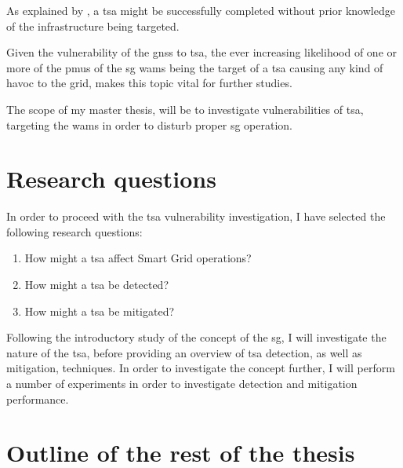 As explained by \cite{xue2021data}, a \acrlong{tsa} might be successfully completed without prior knowledge of the infrastructure being targeted. 

Given the vulnerability of the \acrshort{gnss} to \acrshort{tsa}, the ever increasing likelihood of one or more of the \acrshort{pmu}s of the \acrshort{sg} \acrshort{wams} being the target of a \acrshort{tsa} causing any kind of havoc to the grid, makes this topic vital for further studies.



The scope of my master thesis, will be to investigate vulnerabilities of \acrfull{tsa}, targeting the \acrfull{wams} in order to disturb proper \acrshort{sg} operation.

\section{Research questions}
In order to proceed with the \acrshort{tsa} vulnerability investigation, I have selected the following research questions:

\begin{enumerate}
    \item How might a \acrshort{tsa} affect Smart Grid operations?
    \item How might a \acrshort{tsa} be detected?
    \item How might a \acrshort{tsa} be mitigated?
\end{enumerate}

Following the introductory study of the concept of the \acrshort{sg}, I will investigate the nature of the \acrfull{tsa}, before providing an overview of  \acrshort{tsa} detection, as well 
as mitigation, techniques. In order to investigate the concept further, I will perform a number of experiments in order to investigate detection and mitigation performance. 


\section{Outline of the rest of the thesis}


